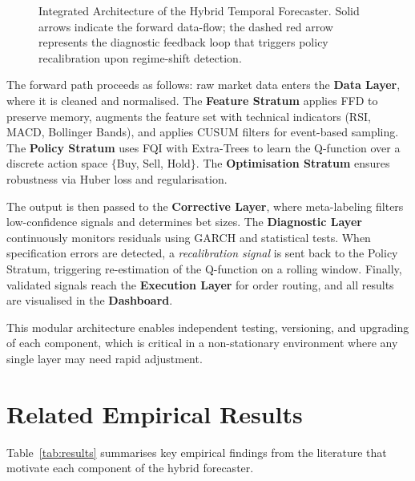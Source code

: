 \documentclass[conference]{IEEEtran}
\begin{document}
\begin{figure}[t]
\caption{Integrated Architecture of the Hybrid Temporal Forecaster. Solid arrows indicate the forward data-flow; the dashed red arrow represents the diagnostic feedback loop that triggers policy recalibration upon regime-shift detection.}
\label{fig:arch}
\end{figure}

The forward path proceeds as follows: raw market data enters the \textbf{Data Layer}, where it is cleaned and normalised. The \textbf{Feature Stratum} applies FFD to preserve memory, augments the feature set with technical indicators (RSI, MACD, Bollinger Bands), and applies CUSUM filters for event-based sampling. The \textbf{Policy Stratum} uses FQI with Extra-Trees to learn the Q-function over a discrete action space $\{$Buy, Sell, Hold$\}$. The \textbf{Optimisation Stratum} ensures robustness via Huber loss and regularisation.

The output is then passed to the \textbf{Corrective Layer}, where meta-labeling filters low-confidence signals and determines bet sizes. The \textbf{Diagnostic Layer} continuously monitors residuals using GARCH and statistical tests. When specification errors are detected, a \emph{recalibration signal} is sent back to the Policy Stratum, triggering re-estimation of the Q-function on a rolling window. Finally, validated signals reach the \textbf{Execution Layer} for order routing, and all results are visualised in the \textbf{Dashboard}.

This modular architecture enables independent testing, versioning, and upgrading of each component, which is critical in a non-stationary environment where any single layer may need rapid adjustment.

\section{Related Empirical Results}

Table~\ref{tab:results} summarises key empirical findings from the literature that motivate each component of the hybrid forecaster.
\end{document}

